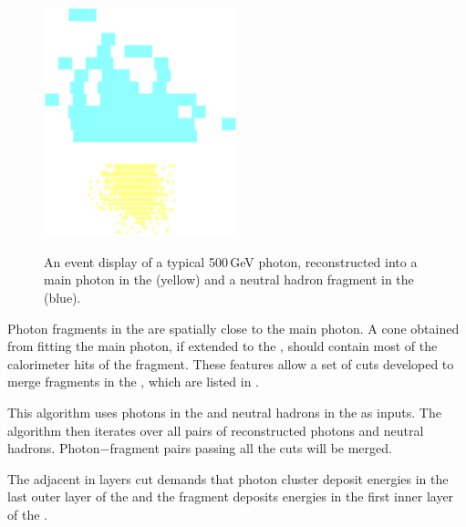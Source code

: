 

\begin{figure}[tbph]
\centering
{\includegraphics[width=0.5\textwidth]{photon/hcalfrag}}%
\caption{An event display of a typical 500\,GeV photon, reconstructed into a main photon in the \ECAL (yellow) and a neutral hadron fragment in the \HCAL (blue).}
\label{fig:photonEvtDspHCalFrag}
\end{figure}

Photon fragments in the \HCAL are  spatially close to the main photon. A cone obtained from fitting the main photon, if extended to the \HCAL, should contain most of the calorimeter hits of the fragment. These features allow a set of cuts developed to merge  fragments in the \HCAL, which are listed in .


This algorithm uses photons in the \ECAL and neutral hadrons in the \HCAL as inputs. The algorithm then iterates over all pairs of reconstructed photons and neutral hadrons. Photon$-$fragment pairs passing all the cuts will be merged.



The adjacent in layers cut demands that  photon cluster deposit energies in the last outer layer of the \ECAL   and  the fragment deposits energies in the first inner layer of the \HCAL.

